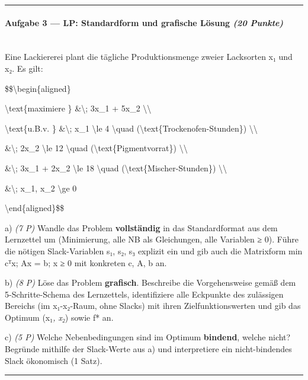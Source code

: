 \documentclass[11pt, a4paper]{article}
\begin{document}
\noindent\textcolor{rulegray}{\rule{\linewidth}{0.4pt}}


\paragraph{Aufgabe 3 — LP: Standardform und grafische Lösung \textit{(20 Punkte)}}\mbox{}\\[2pt]

Eine Lackiererei plant die tägliche Produktionsmenge zweier Lacksorten x₁ und x₂. Es gilt:


\$\$\textbackslash{}begin\{aligned\}

\textbackslash{}text\{maximiere \} \&\textbackslash{}; 3x\_1 + 5x\_2 \textbackslash{}\textbackslash{}

\textbackslash{}text\{u.B.v. \} \&\textbackslash{}; x\_1 \textbackslash{}le 4 \textbackslash{}quad (\textbackslash{}text\{Trockenofen-Stunden\}) \textbackslash{}\textbackslash{}

\&\textbackslash{}; 2x\_2 \textbackslash{}le 12 \textbackslash{}quad (\textbackslash{}text\{Pigmentvorrat\}) \textbackslash{}\textbackslash{}

\&\textbackslash{}; 3x\_1 + 2x\_2 \textbackslash{}le 18 \textbackslash{}quad (\textbackslash{}text\{Mischer-Stunden\}) \textbackslash{}\textbackslash{}

\&\textbackslash{}; x\_1, x\_2 \textbackslash{}ge 0

\textbackslash{}end\{aligned\}\$\$


a) \textit{(7 P)} Wandle das Problem \textbf{vollständig} in das Standardformat aus dem Lernzettel um (Minimierung, alle NB als Gleichungen, alle Variablen ≥ 0). Führe die nötigen Slack-Variablen s₁, s₂, s₃ explizit ein und gib auch die Matrixform min cᵀx; Ax = b; x ≥ 0 mit konkreten c, A, b an.


b) \textit{(8 P)} Löse das Problem \textbf{grafisch}. Beschreibe die Vorgehensweise gemäß dem 5-Schritte-Schema des Lernzettels, identifiziere alle Eckpunkte des zulässigen Bereichs (im x₁-x₂-Raum, ohne Slacks) mit ihren Zielfunktionswerten und gib das Optimum (x₁\textit{, x₂}) sowie f* an.


c) \textit{(5 P)} Welche Nebenbedingungen sind im Optimum \textbf{bindend}, welche nicht? Begründe mithilfe der Slack-Werte aus a) und interpretiere ein nicht-bindendes Slack ökonomisch (1 Satz).



\noindent\textcolor{rulegray}{\rule{\linewidth}{0.4pt}}
\end{document}

